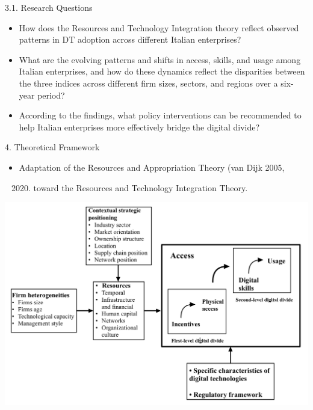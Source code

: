\documentclass[
  ignorenonframetext,
]{beamer}
\providecommand{\tightlist}{%
  \setlength{\itemsep}{0pt}\setlength{\parskip}{0pt}}
\begin{document}
\begin{frame}{3.1. Research Questions}
\label{research-questions}
\begin{itemize}
\item
  How does the Resources and Technology Integration theory reflect
  observed patterns in DT adoption across different Italian enterprises?
\item
  What are the evolving patterns and shifts in access, skills, and usage
  among Italian enterprises, and how do these dynamics reflect the
  disparities between the three indices across different firm sizes,
  sectors, and regions over a six-year period?
\item
  According to the findings, what policy interventions can be
  recommended to help Italian enterprises more effectively bridge the
  digital divide?
\end{itemize}
\end{frame}

\begin{frame}{4. Theoretical Framework}
\label{theoretical-framework}
\begin{itemize}
\tightlist
\item
  Adaptation of the Resources and Appropriation Theory (van Dijk 2005,

  \begin{enumerate}
  [1)]
  \setcounter{enumi}{2019}
  \tightlist
  \item
    toward the Resources and Technology Integration Theory.
  \end{enumerate}
\end{itemize}

\begin{center}
\includegraphics[width=1\textwidth, height=0.75\textheight]{dd_model.png}
\end{center}
\end{frame}
\end{document}
